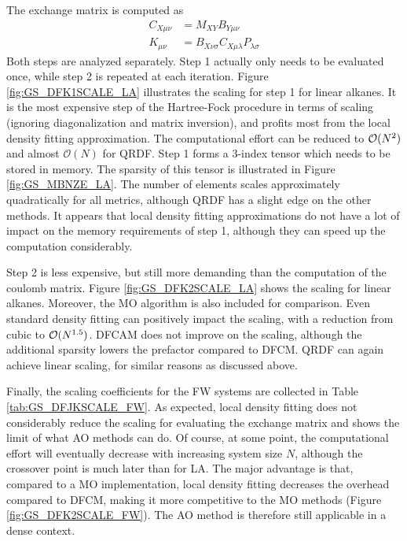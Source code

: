The exchange matrix is computed as
\begin{align}
C_{X\mu\nu} &= M_{XY} B_{Y\mu\nu} \\
K_{\mu\nu} &= B_{X\nu\sigma} C_{X\mu\lambda} P_{\lambda\sigma} 
\end{align}
\noindent Both steps are analyzed separately. Step 1 actually only needs to be evaluated once, while step 2 is repeated at each iteration. Figure \ref{fig:GS_DFK1SCALE_LA} illustrates the scaling for step 1 for linear alkanes. It is the most expensive step of the Hartree-Fock procedure in terms of scaling (ignoring diagonalization and matrix inversion), and profits most from the local density fitting approximation. The computational effort can be reduced to $\mathcal{O}(N^{2})$ and almost $\mathcal{O}(N)$ for QRDF. Step 1 forms a 3-index tensor which needs to be stored in memory. The sparsity of this tensor is illustrated in Figure \ref{fig:GS_MBNZE_LA}. The number of elements scales approximately quadratically for all metrics, although QRDF has a slight edge on the other methods. It appears that local density fitting approximations do not have a lot of impact on the memory requirements of step 1, although they can speed up the computation considerably. 

Step 2 is less expensive, but still more demanding than the computation of the coulomb matrix. Figure \ref{fig:GS_DFK2SCALE_LA} shows the scaling for linear alkanes. Moreover, the MO algorithm is also included for comparison. Even standard density fitting can positively impact the scaling, with a reduction from cubic to $\mathcal{O}(N^{1.5})$. DFCAM does not improve on the scaling, although the additional sparsity lowers the prefactor compared to DFCM. QRDF can again achieve linear scaling, for similar reasons as discussed above. 



Finally, the scaling coefficients for the FW systems are collected in Table \ref{tab:GS_DFJKSCALE_FW}. As expected, local density fitting does not considerably reduce the scaling for evaluating the exchange matrix and shows the limit of what AO methods can do. Of course, at some point, the computational effort will eventually decrease with increasing system size $N$, although the crossover point is much later than for LA. The major advantage is that, compared to a MO implementation, local density fitting decreases the overhead compared to DFCM, making it more competitive to the MO methods (Figure \ref{fig:GS_DFK2SCALE_FW}). The AO method is therefore still applicable in a dense context. 

